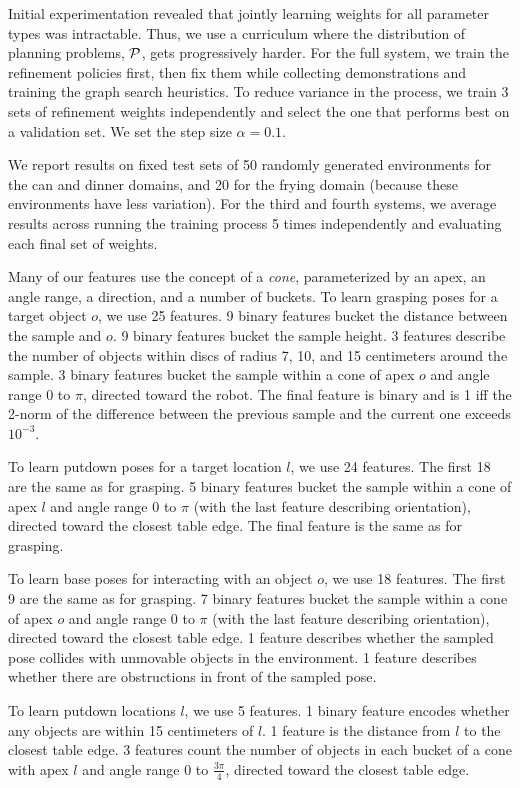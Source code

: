 Initial experimentation revealed that jointly learning weights for all
parameter types was intractable. Thus, we use a curriculum where the
distribution of planning problems, $\mathcal{P}$, gets progressively
harder. For the full system, we train the refinement policies first,
then fix them while collecting demonstrations and training the graph
search heuristics. To reduce variance in the process, we train 3 sets
of refinement weights independently and select the one that performs
best on a validation set. We set the step size $\alpha = 0.1$.

We report results on fixed test sets of 50 randomly generated
environments for the can and dinner domains, and 20 for the frying
domain (because these environments have less variation).  For the
third and fourth systems, we average results across running the
training process 5 times independently and evaluating each final set
of weights.

Many of our features use the concept of a \emph{cone}, parameterized by an apex,
an angle range, a direction, and a number of buckets.
To learn grasping poses for a target object $o$, we use 25 features.
9 binary features bucket the distance between
the sample and $o$. 9 binary features bucket the
sample height. 3 features describe the number of objects within
discs of radius 7, 10, and 15 centimeters around the sample. 3 binary
features bucket the sample within a cone of apex $o$ and angle range 0 to $\pi$, directed
toward the robot. The final feature is binary and is 1 iff the 2-norm of
the difference between the previous sample and the current one exceeds $10^{-3}$.

To learn putdown poses for a target location $l$, we use 24 features. The first
18 are the same as for grasping. 5 binary features bucket the sample within
a cone of apex $l$ and angle range 0 to $\pi$ (with the last feature describing
orientation), directed toward the closest table edge. The final feature is the same as
for grasping.

To learn base poses for interacting with an object $o$, we use 18 features. The first 9 are the same as
for grasping. 7 binary features bucket the sample within a cone of apex $o$ and angle range 0 to $\pi$
(with the last feature describing orientation), directed toward the closest table edge.
1 feature describes whether the sampled pose collides with unmovable objects in the environment.
1 feature describes whether there are obstructions in front of the sampled pose.

To learn putdown locations $l$, we use 5 features. 1 binary feature encodes whether
any objects are within 15 centimeters of $l$. 1 feature is the
distance from $l$ to the closest table edge. 3 features count the number of objects
in each bucket of a cone with apex $l$ and angle range 0 to $\frac{3\pi}{4}$, directed toward the closest table edge.

